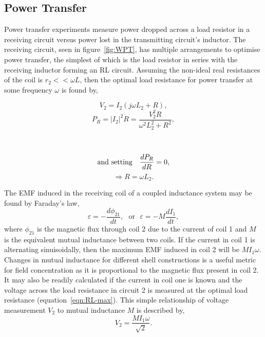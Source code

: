 \documentclass[11pt]{iopart}
\begin{document}
\subsection{Power Transfer}
Power transfer experiments measure power dropped across a load
resistor in a receiving circuit versus power lost in the transmitting
circuit's inductor. The receiving circuit, seen in
figure~\ref{fig:WPT}, has multiple arrangements to optimise power
transfer, the simplest of which is the load resistor in series with
the receiving inductor forming an RL circuit. Assuming the non-ideal
real resistances of the coil is $r_2 << \omega L$, then the optimal
load resistance for power transfer at some frequency $\omega$ is found
by,
\vspace{-0.5em}
\begin{center}
\begin{minipage}{0.4\linewidth}
\begin{equation}
  V_2 = I_2 (j\omega L_2 + R),  
\end{equation}
\begin{equation}
  P_R = |I_2|^2R = \frac{V_2^2R}{\omega^2L_2^2 + R^2},
\end{equation}
\end{minipage}
~~
\vrule
\begin{minipage}{0.4\linewidth}
  $$\text{and setting\quad} \frac{dP_R}{dR} = 0,$$ 
\begin{equation}
  \Rightarrow R = \omega L_2.
  \label{eqn:RL-max}
\end{equation}
\end{minipage}
\end{center}
The EMF induced in the receiving coil of a coupled inductance system
may be found by Faraday's law,
\vspace{-0.5em}
\begin{equation}
  \varepsilon = -\frac{d\phi_{21}}{dt},~~~\text{or}~~~\varepsilon = -M\frac{dI_{1}}{dt},
  \label{eqn:M}
\end{equation}
where $\phi_{21}$ is the magnetic flux through coil 2 due to the
current of coil 1 and $M$ is the equivalent mutual inductance between
two coils.
If the current in coil 1 is alternating sinuisoidally, then the
maximum EMF induced in coil 2 will be $M I_1 \omega$. Changes in
mutual inductance for different shell constructions is a useful metric
for field concentration as it is proportional to the magnetic flux
present in coil 2. It may also be readily calculated if the current in
coil one is known and the voltage across the load resistance in
circuit 2 is measured at the optimal load resistance
(equation~\ref{eqn:RL-max}). This simple relationship of voltage
measurement $V_2$ to mutual inductance $M$ is described by,
\begin{equation}
  V_2 = \frac{MI_1\omega}{\sqrt{2}}.
\label{eqn:MVs}
\end{equation}
\end{document}
